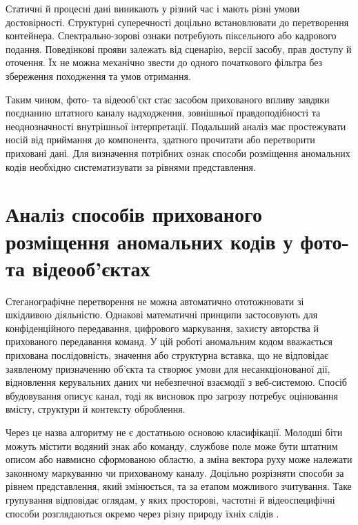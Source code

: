 Статичні й процесні дані виникають у різний час і мають різні умови достовірності. Структурні суперечності доцільно встановлювати до перетворення контейнера. Спектрально-зорові ознаки потребують піксельного або кадрового подання. Поведінкові прояви залежать від сценарію, версії засобу, прав доступу й оточення. Їх не можна механічно звести до одного початкового фільтра без збереження походження та умов отримання.

Таким чином, фото- та відеооб’єкт стає засобом прихованого впливу завдяки поєднанню штатного каналу надходження, зовнішньої правдоподібності та неоднозначності внутрішньої інтерпретації. Подальший аналіз має простежувати носій від приймання до компонента, здатного прочитати або перетворити приховані дані. Для визначення потрібних ознак способи розміщення аномальних кодів необхідно систематизувати за рівнями представлення.

\section{Аналіз способів прихованого розміщення аномальних кодів у фото- та відеооб’єктах}
\label{sec:hidden_code_placement}

Стеганографічне перетворення не можна автоматично ототожнювати зі шкідливою діяльністю. Однакові математичні принципи застосовують для конфіденційного передавання, цифрового маркування, захисту авторства й прихованого передавання команд. У цій роботі аномальним кодом вважається прихована послідовність, значення або структурна вставка, що не відповідає заявленому призначенню об’єкта та створює умови для несанкціонованої дії, відновлення керувальних даних чи небезпечної взаємодії з веб-системою. Спосіб вбудовування описує канал, тоді як висновок про загрозу потребує оцінювання вмісту, структури й контексту оброблення.

Через це назва алгоритму не є достатньою основою класифікації. Молодші біти можуть містити водяний знак або команду, службове поле може бути штатним описом або навмисно сформованою областю, а зміна вектора руху може належати законному маркуванню чи прихованому каналу. Доцільно розрізняти способи за рівнем представлення, який змінюється, та за етапом можливого зчитування. Таке групування відповідає оглядам, у яких просторові, частотні й відеоспецифічні способи розглядаються окремо через різну природу їхніх слідів \cite{muralidharan2022race,bouzegza2022video}.

